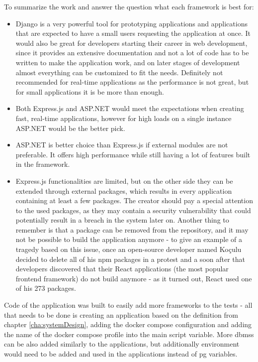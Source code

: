 To summarize the work and answer the question what each framework is best for:
\begin{itemize}
    \item Django is a very powerful tool for prototyping applications and applications that are expected to have a small users requesting the application at once. It would also be great for developers starting their career in web development, since it provides an extensive documentation and not a lot of code has to be written to make the application work, and on later stages of development almost everything can be customized to fit the needs. Definitely not recommended for real-time applications as the performance is not great, but for small applications it is be more than enough.
    \item Both Express.js and ASP.NET would meet the expectations when creating fast, real-time applications, however for high loads on a single instance ASP.NET would be the better pick.
    \item ASP.NET is better choice than Express.js if external modules are not preferable. It offers high performance while still having a lot of features built in the framework.
    \item Express.js functionalities are limited, but on the other side they can be extended through external packages, which results in every application containing at least a few packages. The creator should pay a special attention to the used packages, as they may contain a security vulnerability that could potentially result in a breach in the system later on. Another thing to remember is that a package can be removed from the repository, and it may not be possible to build the application anymore - to give an example of a tragedy based on this issue, once an open-source developer named Koçulu decided to delete all of his npm packages in a protest and a soon after that developers discovered that their React applications (the most popular frontend framework) do not build anymore - as it turned out, React used one of his 273 packages.
\end{itemize}

Code of the application was built to easily add more frameworks to the tests - all that needs to be done is creating an application based on the definition from chapter \ref{cha:systemDesign}, adding the docker compose configuration and adding the name of the docker compose profile into the main script variable. More \acrlong{dbms}s can be also added similarly to the applications, but additionally environment would need to be added and used in the applications instead of \acrlong{pg} variables.
